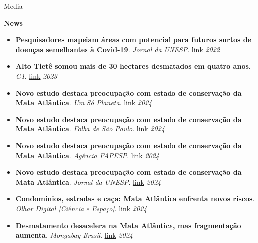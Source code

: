 \documentclass{resume}
\begin{document}
\begin{rSection}{Media}

{\bf News}
\begin{itemize} 
\item {\bf Pesquisadores mapeiam áreas com potencial para futuros surtos de doenças semelhantes à Covid-19}. {\it Jornal da UNESP}. \href{https://jornal.unesp.br/2022/06/23/pesquisadores-mapeiam-areas-com-potencial-para-futuros-surtos-de-doencas-semelhantes-a-covid-19/}{\underline{link}} \hfill{\em 2022}
\item {\bf Alto Tietê somou mais de 30 hectares desmatados em quatro anos}. {\it G1}. \href{https://g1.globo.com/sp/mogi-das-cruzes-suzano/noticia/2023/06/05/em-quatro-anos-alto-tiete-somou-mais-de-30-hectares-desmatados.ghtml}{\underline{link}} \hfill{\em 2023}
\item {\bf Novo estudo destaca preocupação com estado de conservação da Mata Atlântica}. {\it Um Só Planeta}. \href{https://umsoplaneta.globo.com/biodiversidade/noticia/2024/06/24/novo-estudo-destaca-preocupacao-com-estado-de-conservacao-da-mata-atlantica.ghtml?utm_campaign=na_midia__n_23_junho_2024&utm_medium=email&utm_source=RD+Station}{\underline{link}} \hfill{\em 2024}
\item {\bf Novo estudo destaca preocupação com estado de conservação da Mata Atlântica}. {\it Folha de São Paulo}. \href{https://www1.folha.uol.com.br/folha-social-mais/2024/06/novo-estudo-destaca-preocupacao-com-estado-de-conservacao-da-mata-atlantica.shtml?utm_campaign=na_midia__n_23_junho_2024&utm_medium=email&utm_source=RD+Station}{\underline{link}} \hfill{\em 2024}
\item {\bf Novo estudo destaca preocupação com estado de conservação da Mata Atlântica}. {\it Agência FAPESP}. \href{https://agencia.fapesp.br/novo-estudo-destaca-preocupacao-com-estado-de-conservacao-da-mata-atlantica/52013}{\underline{link}} \hfill{\em 2024}
\item {\bf Novo estudo destaca preocupação com estado de conservação da Mata Atlântica}. {\it Jornal da UNESP}. \href{https://jornal.unesp.br/2024/03/15/novo-estudo-destaca-preocupacao-com-estado-de-conservacao-da-mata-atlantica/}{\underline{link}} \hfill{\em 2024}
\item {\bf Condomínios, estradas e caça: Mata Atlântica enfrenta novos riscos}. {\it Olhar Digital [Ciência e Espaço]}. \href{https://olhardigital.com.br/2024/06/25/ciencia-e-espaco/condominios-estradas-e-caca-mata-atlantica-enfrenta-novos-riscos/}{\underline{link}} \hfill{\em 2024}
\item {\bf Desmatamento desacelera na Mata Atlântica, mas fragmentação aumenta}. {\it Mongabay Brasil}. \href{https://brasil.mongabay.com/2024/07/desmatamento-desacelera-na-mata-atlantica-mas-fragmentacao-aumenta}{\underline{link}} \hfill{\em 2024}

\end{itemize}
\end{rSection}
\end{document}
